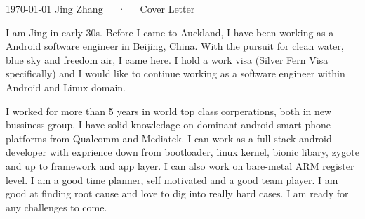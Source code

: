 \documentclass[12pt, a4paper]{awesome-cv}
\begin{document}
\makecvheader

\makecvfooter
  {\today}
  {Jing Zhang~~~·~~~Cover Letter}
  {}

\makelettertitle

\begin{cvletter}

I am Jing in early 30s. Before I came to Auckland, I have been working as a Android software engineer in Beijing, China. With the pursuit for clean water, blue sky and freedom air, I came here. I hold a work visa (Silver Fern Visa specifically) and I would like to continue working as a software engineer within Android and Linux domain.


I worked for more than 5 years in world top class corperations, both in new bussiness group. I have solid knowledage on dominant android smart phone platforms from Qualcomm and Mediatek. I can work as a full-stack android developer with exprience down from bootloader, linux kernel, bionic libary, zygote and up to framework and app layer. I can also work on bare-metal ARM register level. I am a good time planner, self motivated and  a good team player. I am good at finding root cause and love to dig into really hard cases. I am ready for any challenges to come. 

\end{cvletter}


\makeletterclosing
\end{document}
